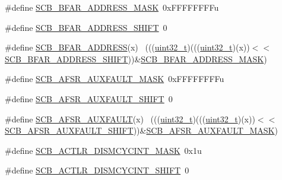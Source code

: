 \begin{DoxyCompactItemize}
\item 
\#define \hyperlink{group___s_c_b___register___masks_ga06dcfef31b1e1581acbd10898ff4518b}{S\+C\+B\+\_\+\+B\+F\+A\+R\+\_\+\+A\+D\+D\+R\+E\+S\+S\+\_\+\+M\+A\+SK}~0x\+F\+F\+F\+F\+F\+F\+F\+Fu
\item 
\#define \hyperlink{group___s_c_b___register___masks_ga31b33596b81d9fc88c64157b518bd434}{S\+C\+B\+\_\+\+B\+F\+A\+R\+\_\+\+A\+D\+D\+R\+E\+S\+S\+\_\+\+S\+H\+I\+FT}~0
\item 
\#define \hyperlink{group___s_c_b___register___masks_ga1ebe7e735178cf8245b2bfc1af3cea0a}{S\+C\+B\+\_\+\+B\+F\+A\+R\+\_\+\+A\+D\+D\+R\+E\+SS}(x)                                        ~(((\hyperlink{_p_e___types_8h_a33594304e786b158f3fb30289278f5af}{uint32\+\_\+t})(((\hyperlink{_p_e___types_8h_a33594304e786b158f3fb30289278f5af}{uint32\+\_\+t})(x))$<$$<$\hyperlink{group___s_c_b___register___masks_ga31b33596b81d9fc88c64157b518bd434}{S\+C\+B\+\_\+\+B\+F\+A\+R\+\_\+\+A\+D\+D\+R\+E\+S\+S\+\_\+\+S\+H\+I\+FT}))\&\hyperlink{group___s_c_b___register___masks_ga06dcfef31b1e1581acbd10898ff4518b}{S\+C\+B\+\_\+\+B\+F\+A\+R\+\_\+\+A\+D\+D\+R\+E\+S\+S\+\_\+\+M\+A\+SK})
\item 
\#define \hyperlink{group___s_c_b___register___masks_ga7664f289a25c34670bd752c23fd47c8a}{S\+C\+B\+\_\+\+A\+F\+S\+R\+\_\+\+A\+U\+X\+F\+A\+U\+L\+T\+\_\+\+M\+A\+SK}~0x\+F\+F\+F\+F\+F\+F\+F\+Fu
\item 
\#define \hyperlink{group___s_c_b___register___masks_ga6e27cdbb224a5d0a575fce61386ea774}{S\+C\+B\+\_\+\+A\+F\+S\+R\+\_\+\+A\+U\+X\+F\+A\+U\+L\+T\+\_\+\+S\+H\+I\+FT}~0
\item 
\#define \hyperlink{group___s_c_b___register___masks_gaf77ae10495cf1061dfa77ceda3454679}{S\+C\+B\+\_\+\+A\+F\+S\+R\+\_\+\+A\+U\+X\+F\+A\+U\+LT}(x)                                      ~(((\hyperlink{_p_e___types_8h_a33594304e786b158f3fb30289278f5af}{uint32\+\_\+t})(((\hyperlink{_p_e___types_8h_a33594304e786b158f3fb30289278f5af}{uint32\+\_\+t})(x))$<$$<$\hyperlink{group___s_c_b___register___masks_ga6e27cdbb224a5d0a575fce61386ea774}{S\+C\+B\+\_\+\+A\+F\+S\+R\+\_\+\+A\+U\+X\+F\+A\+U\+L\+T\+\_\+\+S\+H\+I\+FT}))\&\hyperlink{group___s_c_b___register___masks_ga7664f289a25c34670bd752c23fd47c8a}{S\+C\+B\+\_\+\+A\+F\+S\+R\+\_\+\+A\+U\+X\+F\+A\+U\+L\+T\+\_\+\+M\+A\+SK})
\item 
\#define \hyperlink{group___s_c_b___register___masks_gaae602d6292782f5741df72e5343d314a}{S\+C\+B\+\_\+\+A\+C\+T\+L\+R\+\_\+\+D\+I\+S\+M\+C\+Y\+C\+I\+N\+T\+\_\+\+M\+A\+SK}~0x1u
\item 
\#define \hyperlink{group___s_c_b___register___masks_gaa90446250553adb9c3d3825a1a2d2529}{S\+C\+B\+\_\+\+A\+C\+T\+L\+R\+\_\+\+D\+I\+S\+M\+C\+Y\+C\+I\+N\+T\+\_\+\+S\+H\+I\+FT}~0

\end{DoxyCompactItemize}
